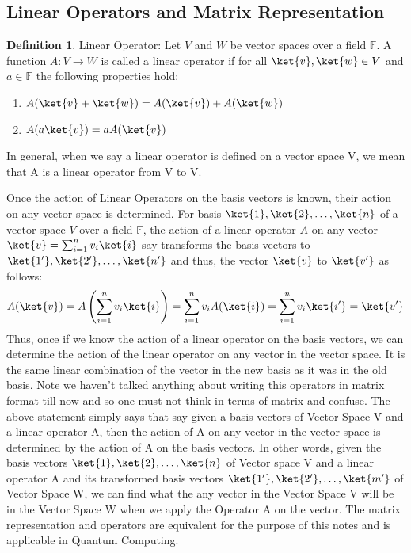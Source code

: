 \documentclass[12pt, oneside]{book}
\theoremstyle{definition}
\newtheorem{definition}{Definition}[section]
\theoremstyle{definition}
\theoremstyle{remark}
\begin{document}
\subsection{Linear Operators and Matrix Representation}
\begin{definition}
    Linear Operator: Let $V$ and $W$ be vector spaces over a field $\mathbb{F}$. A function $A:V\rightarrow W$ is called a linear operator if for all $\ket{v},\ket{w}\in V$ and $a\in\mathbb{F}$ the following properties hold:
    \begin{enumerate}
        \item $A(\ket{v}+\ket{w})=A(\ket{v})+A(\ket{w})$
        \item $A(a\ket{v})=aA(\ket{v})$
    \end{enumerate}
\end{definition}

In general, when we say a linear operator is defined on a vector space V, we mean that A is a
linear operator from V to V. 

Once the action of Linear Operators on the basis vectors is known,
their action on any vector space is determined. For basis $\ket{1},\ket{2},\ldots,\ket{n}$ of a vector space $V$ over a field $\mathbb{F}$, the action of a linear operator $A$
on any vector $\ket{v}=\sum_{i=1}^n v_i\ket{i}$ say transforms the basis vectors to $\ket{1'}, \ket{2'}, \ldots, \ket{n'}$ and thus, the vector $\ket{v}$ to $\ket{v'}$ as follows:
\[A(\ket{v})=A\left(\sum_{i=1}^n v_i\ket{i}\right)=\sum_{i=1}^n v_iA(\ket{i})=\sum_{i=1}^n v_i \ket{i'}=\ket{v'}\]
Thus, once if we know the action of a linear operator on the basis vectors, we can determine the action of the linear operator on any vector in the vector space. It is the same linear combination
of the vector in the new basis as it was in the old basis. Note we haven't talked anything about writing this operators in matrix format till now and so one must not think in terms of matrix and confuse. 
The above statement simply says that say given a basis vectors of Vector Space V and a linear operator A, then the action of A on any vector in the vector space is determined by the action of A on the basis vectors.
In other words, given the basis vectors $\ket{1},\ket{2},\ldots,\ket{n}$ of Vector space V and a linear operator A and its transformed basis vectors $\ket{1'},\ket{2'},\ldots,\ket{m'}$ of Vector Space W, we can find what the any vector in the 
Vector Space V will be in the Vector Space W when we apply the Operator A on the vector. 
The matrix representation and operators are equivalent for the purpose of this notes and is applicable in 
Quantum Computing.
\end{document}
